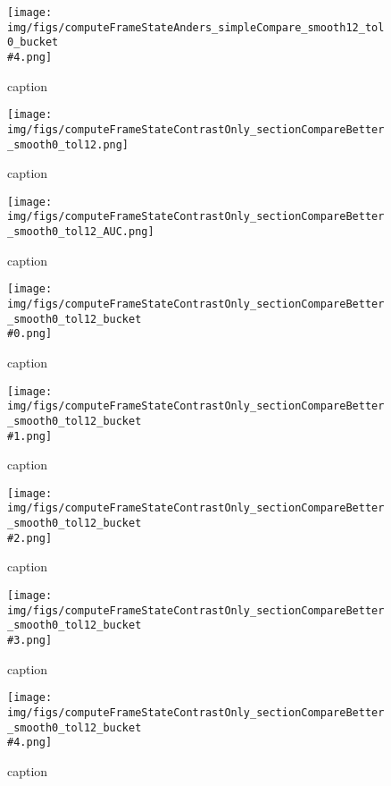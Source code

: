 %
\begin{figure}[!ht]
	\centering
	\texttt{[image: img/figs/computeFrameStateAnders\_simpleCompare\_smooth12\_tol0\_bucket\\\#4.png]}
	\caption{caption}
	\label{fig:computeFrameStateAnders_simpleCompare_smooth12_tol0_bucket\#4.png}
\end{figure}
%
\begin{figure}[!ht]
	\centering
	\texttt{[image: img/figs/computeFrameStateContrastOnly\_sectionCompareBetter\_smooth0\_tol12.png]}
	\caption{caption}
	\label{fig:computeFrameStateContrastOnly_sectionCompareBetter_smooth0_tol12.png}
\end{figure}
%
\begin{figure}[!ht]
	\centering
	\texttt{[image: img/figs/computeFrameStateContrastOnly\_sectionCompareBetter\_smooth0\_tol12\_AUC.png]}
	\caption{caption}
	\label{fig:computeFrameStateContrastOnly_sectionCompareBetter_smooth0_tol12_AUC.png}
\end{figure}
%
\begin{figure}[!ht]
	\centering
	\texttt{[image: img/figs/computeFrameStateContrastOnly\_sectionCompareBetter\_smooth0\_tol12\_bucket\\\#0.png]}
	\caption{caption}
	\label{fig:computeFrameStateContrastOnly_sectionCompareBetter_smooth0_tol12_bucket\#0.png}
\end{figure}
%
\begin{figure}[!ht]
	\centering
	\texttt{[image: img/figs/computeFrameStateContrastOnly\_sectionCompareBetter\_smooth0\_tol12\_bucket\\\#1.png]}
	\caption{caption}
	\label{fig:computeFrameStateContrastOnly_sectionCompareBetter_smooth0_tol12_bucket\#1.png}
\end{figure}
%
\begin{figure}[!ht]
	\centering
	\texttt{[image: img/figs/computeFrameStateContrastOnly\_sectionCompareBetter\_smooth0\_tol12\_bucket\\\#2.png]}
	\caption{caption}
	\label{fig:computeFrameStateContrastOnly_sectionCompareBetter_smooth0_tol12_bucket\#2.png}
\end{figure}
%
\begin{figure}[!ht]
	\centering
	\texttt{[image: img/figs/computeFrameStateContrastOnly\_sectionCompareBetter\_smooth0\_tol12\_bucket\\\#3.png]}
	\caption{caption}
	\label{fig:computeFrameStateContrastOnly_sectionCompareBetter_smooth0_tol12_bucket\#3.png}
\end{figure}
%
\begin{figure}[!ht]
	\centering
	\texttt{[image: img/figs/computeFrameStateContrastOnly\_sectionCompareBetter\_smooth0\_tol12\_bucket\\\#4.png]}
	\caption{caption}
	\label{fig:computeFrameStateContrastOnly_sectionCompareBetter_smooth0_tol12_bucket\#4.png}
\end{figure}
